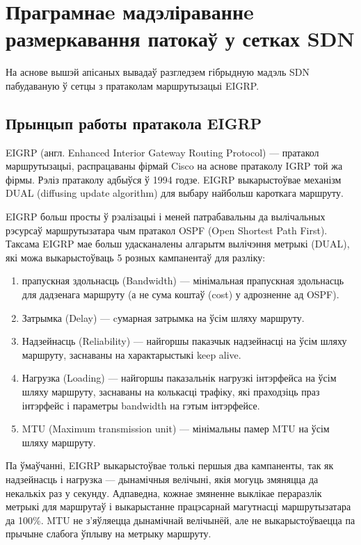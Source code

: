 \section{Праграмнаe мадэліраваннe размеркавання патокаў у сетках SDN}

На аснове вышэй апісаных вывадаў разгледзем гібрыдную мадэль SDN
пабудаваную ў сетцы з пратаколам маршрутызацыі EIGRP.

\subsection{Прынцып работы пратакола EIGRP}

EIGRP (англ. Enhanced Interior Gateway Routing Protocol) --- пратакол маршрутызацыі, распрацаваны фірмай Cisco на аснове пратаколу IGRP той жа фірмы. Рэліз пратаколу адбыўся ў 1994 годзе. EIGRP выкарыстоўвае механізм DUAL (diffusing update algorithm) для выбару найбольш кароткага маршруту.

EIGRP больш просты ў рэалізацыі і меней патрабавальны да вылічальных рэсурсаў маршрутызатара чым пратакол OSPF (Open Shortest Path First). Таксама EIGRP мае больш удасканалены алгарытм вылічэння метрыкі (DUAL), які можа выкарыстоўваць 5 розных кампанентаў для разліку:

\begin{enumerate}
    \item прапускная здольнасць (Bandwidth) --- мінімальная прапускная здольнасць для дадзенага маршруту (а не сума коштаў (cost) у адрозненне ад OSPF).
    \item Затрымка (Delay) --- cумарная затрымка на ўсім шляху маршруту.
    \item Надзейнасць (Reliability) --- найгоршы паказчык надзейнасці на ўсім шляху маршруту, заснаваны на характарыстыкі keep alive.
    \item Нагрузка (Loading) --- найгоршы паказальнік нагрузкі інтэрфейса на ўсім шляху маршруту, заснаваны на колькасці трафіку, які праходзіць праз інтэрфейс і параметры bandwidth на гэтым інтэрфейсе.
    \item MTU (Maximum transmission unit) --- мінімальны памер MTU на ўсім шляху маршруту.
\end{enumerate}

Па ўмаўчанні, EIGRP выкарыстоўвае толькі першыя два кампаненты, так як надзейнасць і нагрузка --- дынамічныя велічыні, якія могуць змяняцца да некалькіх раз у секунду. Адпаведна, кожнае змяненне выклікае пераразлік метрыкі для маршрутаў і выкарыстанне працэсарнай магутнасці маршрутызатара да 100\%. MTU не з'яўляецца дынамічнай велічынёй, але не выкарыстоўваецца па прычыне слабога ўплыву на метрыку маршруту.

